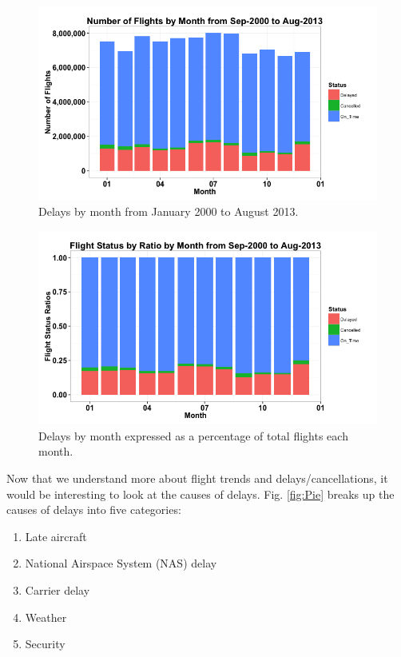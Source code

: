 \documentclass[11pt,twoside,titlepage]{article}
\begin{document}
\begin{figure}[h!]
        \centering
                \includegraphics[width=16cm]{Bar1.png}
        \caption{Delays by month from January 2000 to August 2013.}\label{fig:Flights by Month}
\end{figure}

\begin{figure}[h!]
        \centering
                \includegraphics[width=16cm]{Bar2.png}
        \caption{Delays by month expressed as a percentage of total flights each month.}\label{fig:Flights by Month Percentage}
\end{figure}

\break

Now that we understand more about flight trends and delays/cancellations, it would be interesting to look at the causes of delays. Fig. \ref{fig:Pie} breaks up the causes of delays into five categories:

\begin{enumerate}\itemsep1pt \parskip0pt 
  \item Late aircraft
  \item National Airspace System (NAS) delay
  \item Carrier delay
  \item Weather
  \item Security
\end{enumerate}
\end{document}
